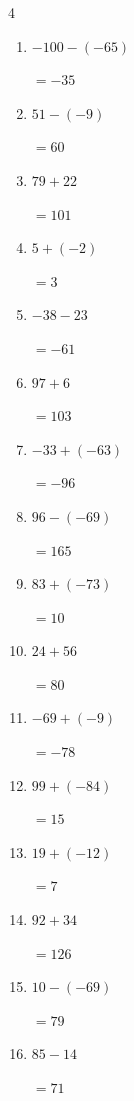 \begin{multicols}{4}
\begin{enumerate}
        $=-88$

  \item $-100-(-65)$

        $=-35$

  \item $51-(-9)$

        $=60$

  \item $79+22$

        $=101$

  \item $5+(-2)$

        $=3$

  \item $-38-23$

        $=-61$

  \item $97+6$

        $=103$

  \item $-33+(-63)$

        $=-96$

\columnbreak %

\resetques

  \item $96-(-69)$

        $=165$

  \item $83+(-73)$

        $=10$

  \item $24+56$

        $=80$

  \item $-69+(-9)$

        $=-78$

  \item $99+(-84)$

        $=15$

  \item $19+(-12)$

        $=7$

  \item $92+34$

        $=126$

  \item $10-(-69)$

        $=79$

  \item $85-14$

        $=71$


\end{enumerate}
\end{multicols}

